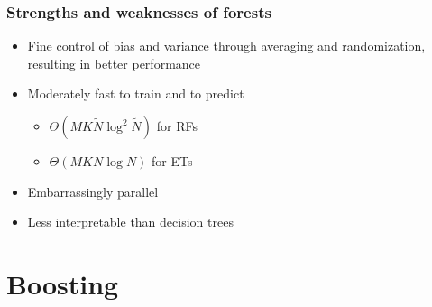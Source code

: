 \documentclass{beamer}
\begin{document}
\begin{frame}
  \frametitle{Strengths and weaknesses of forests}

  \begin{itemize}

    \item {\color{blue}Fine control} of bias and variance through averaging and randomization, resulting in {\color{blue} better performance}

    \vspace{0.25cm}

    \item Moderately fast to train and to predict
        \begin{itemize}
            \item $\Theta(MK\widetilde{N}\log^2 \widetilde{N})$ for RFs
            \item $\Theta(MKN\log N)$ for ETs
        \end{itemize}

    \vspace{0.25cm}

    \item Embarrassingly {\color{blue} parallel}

    \vspace{0.25cm}

    \item {\color{red} Less interpretable} than decision trees
  \end{itemize}
\end{frame}



\section{Boosting}
\end{document}

